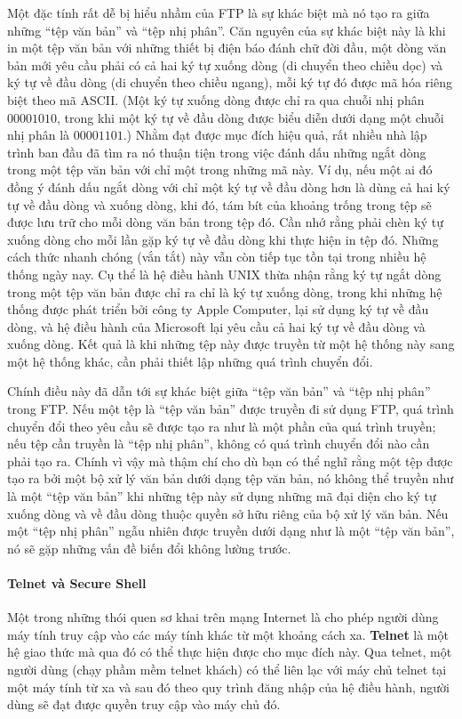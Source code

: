 Một đặc tính rất dễ bị hiểu nhầm của FTP là sự khác biệt mà nó tạo ra giữa những ``tệp văn
bản'' và ``tệp nhị phân''. Căn nguyên của sự khác biệt này là khi in một tệp văn bản với
những thiết bị điện báo đánh chữ đời đầu, một dòng văn bản mới yêu cầu phải có cả hai ký
tự xuống dòng (di chuyển theo chiều dọc) và ký tự về đầu dòng (di chuyển theo chiều
ngang), mỗi ký tự đó được mã hóa riêng biệt theo mã ASCII. (Một ký tự xuống dòng được chỉ
ra qua chuỗi nhị phân $00001010$, trong khi một ký tự về đầu dòng được biểu diễn dưới dạng
một chuỗi nhị phân là $00001101$.) Nhằm đạt được mục đích hiệu quả, rất nhiều nhà lập
trình ban đầu đã tìm ra nó thuận tiện trong việc đánh dấu những ngắt dòng trong một tệp
văn bản với chỉ một trong những mã này. Ví dụ, nếu một ai đó đồng ý đánh dấu ngắt dòng với
chỉ một ký tự về đầu dòng hơn là dùng cả hai ký tự về đầu dòng và xuống dòng, khi đó, tám
bít của khoảng trống trong tệp sẽ được lưu trữ cho mỗi dòng văn bản trong tệp đó. Cần nhớ
rằng phải chèn ký tự xuống dòng cho mỗi lần gặp ký tự về đầu dòng khi thực hiện in tệp
đó. Những cách thức nhanh chóng (vắn tắt) này vẫn còn tiếp tục tồn tại trong nhiều hệ
thống ngày nay. Cụ thể là hệ điều hành UNIX thừa nhận rằng ký tự ngắt dòng trong một tệp
văn bản được chỉ ra chỉ là ký tự xuống dòng, trong khi những hệ thống được phát triển bởi
công ty Apple Computer, lại sử dụng ký tự về đầu dòng, và hệ điều hành của Microsoft lại
yêu cầu cả hai ký tự về đầu dòng và xuống dòng. Kết quả là khi những tệp này được truyền
từ một hệ thống này sang một hệ thống khác, cần phải thiết lập những quá trình chuyển đổi.

Chính điều này đã dẫn tới sự khác biệt giữa ``tệp văn bản'' và ``tệp nhị phân'' trong
FTP. Nếu một tệp là ``tệp văn bản'' được truyền đi sử dụng FTP, quá trình chuyển đổi theo
yêu cầu sẽ được tạo ra như là một phần của quá trình truyền; nếu tệp cần truyền là ``tệp
nhị phân'', không có quá trình chuyển đổi nào cần phải tạo ra. Chính vì vậy mà thậm chí
cho dù bạn có thể nghĩ rằng một tệp được tạo ra bởi một bộ xử lý văn bản dưới dạng tệp văn
bản, nó không thể truyền như là một ``tệp văn bản'' khi những tệp này sử dụng những mã đại
diện cho ký tự xuống dòng và về đầu dòng thuộc quyền sở hữu riêng của bộ xử lý văn
bản. Nếu một ``tệp nhị phân'' ngẫu nhiên được truyền dưới dạng như là một ``tệp văn bản'',
nó sẽ gặp những vấn đề biến đổi không lường trước.

\paragraph{Telnet và Secure Shell} Một trong những thói quen sơ khai trên mạng Internet là
cho phép người dùng máy tính truy cập vào các máy tính khác từ một khoảng cách
xa. \textbf{Telnet} là một hệ giao thức mà qua đó có thể thực hiện được cho mục đích
này. Qua telnet, một người dùng (chạy phầm mềm telnet khách) có thể liên lạc với máy chủ
telnet tại một máy tính từ xa và sau đó theo quy trình đăng nhập của hệ điều hành, người
dùng sẽ đạt được quyền truy cập vào máy chủ đó.

